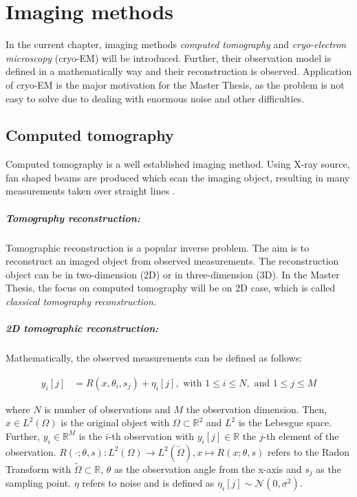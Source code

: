 \chapter{Imaging methods}
\label{sec:imaging}

In the current chapter, imaging methods \textit{computed tomography} and 
\textit{cryo-electron microscopy} (cryo-EM) will be introduced. 
Further, their observation model is defined in a mathematically way and their reconstruction is observed.
Application of cryo-EM is the major motivation for the Master Thesis, 
as the problem is not easy to solve due to dealing with enormous noise and other difficulties.


\section{Computed tomography}
Computed tomography is a well established imaging method.
Using X-ray source, fan shaped beams are produced which scan the imaging object,
resulting in many measurements taken over straight lines \cite{computedTomography}.

\paragraph{Tomography reconstruction:}
Tomographic reconstruction\cite{tomographicReconstruction} is a popular inverse problem. 
The aim is to reconstruct an imaged object from observed measurements.
The reconstruction object can be in two-dimension (2D) or in three-dimension (3D). 
In the Master Thesis, the focus on computed tomography will be on 2D case, which is called \textit{classical tomography reconstruction}.

\paragraph{2D tomographic reconstruction:}

Mathematically, the observed measurements can be defined as follows:

\begin{equation}
    \label{eq:2Dreconstruction}
    \begin{aligned}
        y_i[j] &= R(x, \theta_i, s_j) + \eta_i[j] , \text{ with } 1 \leq i \leq N, \text{ and } 1 \leq j \leq M
    \end{aligned}
\end{equation}

where $N$ is number of observations and $M$ the observation dimension.
Then, $x \in L^2(\Omega)$ is the original object with $\Omega \subset \mathbb{R}^2 $ and $L^2$ is the Lebesgue space.
Further, $y_i \in \mathbb{R}^M$ is the $i$-th observation with $y_i[j] \in \mathbb{R}$ the $j$-th element of the observation.
$R(\cdot; \theta, s): L^2(\Omega) \to L^2(\tilde{\Omega}) , x \mapsto R(x; \theta,s)$ refers to the Radon Transform
with $\tilde{\Omega} \subset \mathbb{R}$, $\theta$ as the observation angle from the x-axis and $s_j$ as the sampling point.
$\eta$ refers to noise and is defined as $\eta_i[j] \sim \mathcal{N}(0,\sigma^2)$.


